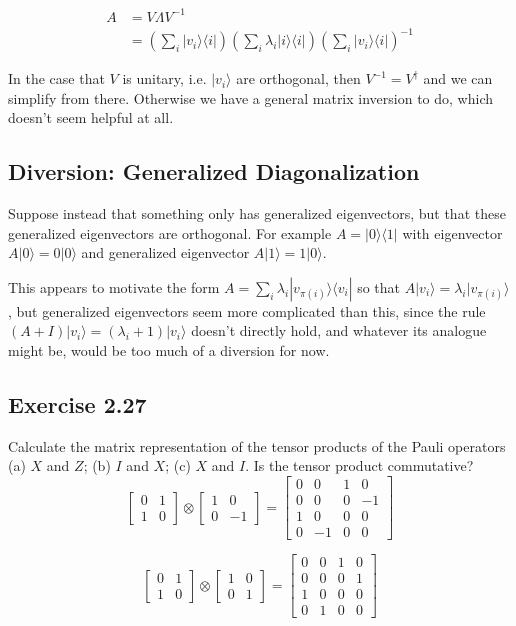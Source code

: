 \documentclass[]{article}
\newcommand{\bra}[1]{\langle #1 |}
\newcommand{\ket}[1]{| #1 \rangle}
\begin{document}
\begin{align*}
A &= V\Lambda V^{-1}
\\&=
\left(\sum_i \ket{v_i}\bra{i}\right)
\left(\sum_i \lambda_i\ket{i}\bra{i}\right)
\left(\sum_i \ket{v_i}\bra{i}\right)^{-1}
\end{align*}

In the case that $V$ is unitary, i.e. $\ket{v_i}$ are orthogonal, then $V^{-1}=V^\dagger$ and we can simplify from there. Otherwise we have a general matrix inversion to do, which doesn't seem helpful at all.

\subsection{Diversion: Generalized Diagonalization}

Suppose instead that something only has generalized eigenvectors, but that these generalized eigenvectors are orthogonal. For example $A = \ket{0}\bra{1}$ with eigenvector $A\ket{0} = 0\ket{0}$ and generalized eigenvector $A\ket{1} = 1\ket{0}$.

This appears to motivate the form $A=\sum_i \lambda_i \ket{v_{\pi(i)}}\bra{v_i}$ so that $A\ket{v_i} = \lambda_i \ket{v_{\pi(i)}}$, but generalized eigenvectors seem more complicated than this, since the rule $(A + I)\ket{v_i} = (\lambda_i + 1)\ket{v_i}$ doesn't directly hold, and whatever its analogue might be, would be too much of a diversion for now.

\subsection{Exercise 2.27}
Calculate the matrix representation of the tensor products of the Pauli operators (a) $X$ and $Z$; (b) $I$ and $X$; (c) $X$ and $I$. Is the tensor product commutative?
\[
\left[\begin{matrix}
0 & 1 \\
1 & 0
\end{matrix}\right]
\otimes
\left[\begin{matrix}
1 & 0 \\
0 & -1
\end{matrix}\right]
=
\left[\begin{matrix}
0 & 0 & 1 & 0 \\
0 & 0 & 0 & -1 \\
1 & 0 & 0 & 0 \\
0 & -1 & 0 & 0
\end{matrix}\right]
\]

\[
\left[\begin{matrix}
0 & 1 \\
1 & 0
\end{matrix}\right]
\otimes
\left[\begin{matrix}
1 & 0 \\
0 & 1
\end{matrix}\right]
=
\left[\begin{matrix}
0 & 0 & 1 & 0 \\
0 & 0 & 0 & 1 \\
1 & 0 & 0 & 0 \\
0 & 1 & 0 & 0
\end{matrix}\right]
\]
\end{document}
